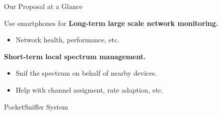 \begin{frame}{Our Proposal at a Glance}
  \begin{block}{Use smartphones for}
    \textbf{Long-term large scale network monitoring.}
    \begin{itemize}
      \item Network health, performance, etc.
    \end{itemize}
    \textbf{Short-term local spectrum management.}
    \begin{itemize}
      \item Snif the spectrum on behalf of nearby devices.
      \item Help with channel assigment, rate adaption, etc.
    \end{itemize}
  \end{block}
\end{frame}

\begin{frame}{PocketSniffer System}
  \begin{figure}
    \centering
  \end{figure}
\end{frame}
